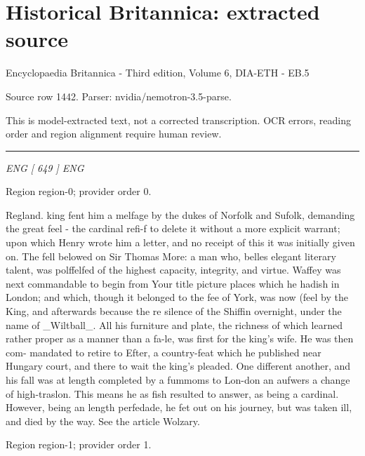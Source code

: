 \documentclass[11pt]{article}
\begin{document}
\section*{Historical Britannica: extracted source}
Encyclopaedia Britannica - Third edition, Volume 6, DIA-ETH - EB.5\par
{\small Source row 1442. Parser: nvidia/nemotron-3.5-parse.\par}
{\small This is model-extracted text, not a corrected transcription. OCR errors, reading order and region alignment require human review.\par}
\hrule\medskip
{\small\itshape ENG [ 649 ] ENG\par}

{\scriptsize\color{gray} Region region-0; provider order 0.\par}
\medskip

Regland.
king fent him a melfage by the dukes of Norfolk and Sufolk, demanding the great feel - the cardinal refi-f to delete it without a more explicit warrant; upon which Henry wrote him a letter, and no receipt of this it was initially given on. The fell belowed on Sir Thomas More: a man who, belles elegant literary talent, was polffelfed of the highest capacity, integrity, and virtue. Waffey was next commandable to begin from Your title picture places which he hadish in London; and which, though it belonged to the fee of York, was now (feel by the King, and afterwards because the re silence of the Shiffin overnight, under the name of \_Wiltball\_. All his furniture and plate, the richness of which learned rather proper as a manner than a fa-le, was first for the king’s wife. He was then com- mandated to retire to Efter, a country-feat which he published near Hungary court, and there to wait the king’s pleaded. One different another, and his fall was at length completed by a fummoms to Lon-don an aufwers a change of high-traslon. This means he as fish resulted to answer, as being a cardinal. However, being an length perfedade, he fet out on his journey, but was taken ill, and died by the way. See the article Wolzary.
\par

{\scriptsize\color{gray} Region region-1; provider order 1.\par}
\medskip
\end{document}
